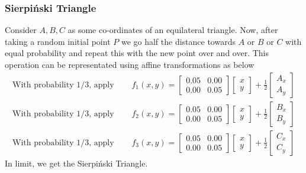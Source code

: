 \documentclass[../../Problems]{subfiles}
\begin{document}
\subsubsection{Sierpi\'nski Triangle}{\label{pp:sierpinskitriangle}}
Consider $A,B,C$ as some co-ordinates of an equilateral triangle. Now, after taking a random initial point $P$ we go half the distance towards $A$ or $B$ or $C$ with equal probability and repeat this with the new point over and over. This operation can be representated using affine transformations as below
\begin{align}
	\text{With probability 1/3, apply }& \quad f_{1}(x,y) = {\begin{bmatrix}0.05&0.00\\0.00&0.05\end{bmatrix}}{\begin{bmatrix}x\\y\end{bmatrix}}+\frac{1}{2}{\begin{bmatrix}A_x \\ A_y \end{bmatrix}}\\
	\text{With probability 1/3, apply }& \quad f_{2}(x,y) = {\begin{bmatrix}0.05&0.00\\0.00&0.05\end{bmatrix}}{\begin{bmatrix}x\\y\end{bmatrix}}+\frac{1}{2}{\begin{bmatrix}B_x \\ B_y \end{bmatrix}}\\
	\text{With probability 1/3, apply }& \quad f_{3}(x,y) = {\begin{bmatrix}0.05&0.00\\0.00&0.05\end{bmatrix}}{\begin{bmatrix}x\\y\end{bmatrix}}+\frac{1}{2}{\begin{bmatrix}C_x \\ C_y \end{bmatrix}}
\end{align}
In limit, we get the Sierpi\'nski Triangle.
\end{document}
